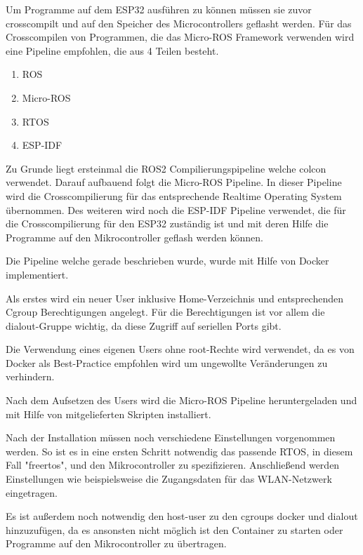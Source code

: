 \begin{flushleft}


    Um Programme auf dem ESP32 ausführen zu können müssen sie zuvor crosscompilt und auf den Speicher des Microcontrollers geflasht werden.
    Für das Crosscompilen von Programmen, die das Micro-ROS Framework verwenden wird eine Pipeline empfohlen, die aus 4 Teilen besteht.
    \begin{enumerate}
        \item ROS
        \item Micro-ROS
        \item RTOS
        \item ESP-IDF
    \end{enumerate}

    Zu Grunde liegt ersteinmal die ROS2 Compilierungspipeline welche colcon verwendet.
    Darauf aufbauend folgt die Micro-ROS Pipeline. In dieser Pipeline wird die Crosscompilierung für das entsprechende Realtime Operating System übernommen.
    Des weiteren wird noch die ESP-IDF Pipeline verwendet, die für die Crosscompilierung für den ESP32 zuständig ist und mit deren Hilfe die Programme auf den Mikrocontroller geflash werden können.

    Die Pipeline welche gerade beschrieben wurde, wurde mit Hilfe von Docker implementiert.

    Als erstes wird ein neuer User inklusive Home-Verzeichnis und entsprechenden Cgroup Berechtigungen angelegt.
    Für die Berechtigungen ist vor allem die dialout-Gruppe wichtig, da diese Zugriff auf seriellen Ports gibt.

    Die Verwendung eines eigenen Users ohne root-Rechte wird verwendet, 
    da es von Docker als Best-Practice empfohlen wird um ungewollte Veränderungen zu verhindern.


    Nach dem Aufsetzen des Users wird die Micro-ROS Pipeline heruntergeladen und mit Hilfe von mitgelieferten Skripten installiert.

    Nach der Installation müssen noch verschiedene Einstellungen vorgenommen werden. So ist es in eine ersten Schritt notwendig das passende RTOS, in diesem Fall "freertos",
    und den Mikrocontroller zu spezifizieren. Anschließend werden Einstellungen wie beispielsweise die Zugangsdaten für das WLAN-Netzwerk eingetragen.

    Es ist außerdem noch notwendig den host-user zu den cgroups docker und dialout hinzuzufügen, 
    da es ansonsten nicht möglich ist den Container zu starten oder Programme auf den Mikrocontroller zu übertragen.



\end{flushleft}
